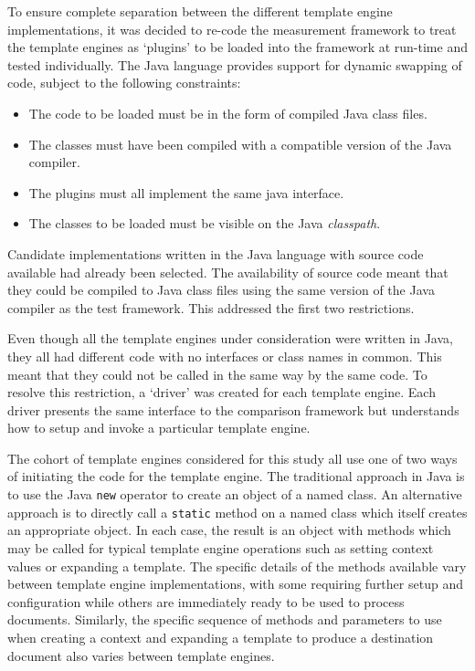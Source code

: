 To ensure complete separation between the different template engine implementations, it was decided to re-code the measurement framework to treat the template engines as `plugins' to be loaded into the framework at run-time and tested individually. The Java language provides support for dynamic swapping of code, subject to the following constraints:

\begin{itemize}
    \item The code to be loaded must be in the form of compiled Java class files.
    \item The classes must have been compiled with a compatible version of the Java compiler.
    \item The plugins must all implement the same java interface.
    \item The classes to be loaded must be visible on the Java \emph{classpath}.
\end{itemize}

Candidate implementations written in the Java language with source code available had already been selected. The availability of source code meant that they could be compiled to Java class files using the same version of the Java compiler as the test framework. This addressed the first two restrictions.

Even though all the template engines under consideration were written in Java, they all had different code with no interfaces or class names in common. This meant that they could not be called in the same way by the same code. To resolve this restriction, a `driver' was created for each template engine. Each driver presents the same interface to the comparison framework but understands how to setup and invoke a particular template engine.

The cohort of template engines considered for this study all use one of two ways of initiating the code for the template engine. The traditional approach in Java is to use the Java \verb!new! operator to create an object of a named class. An alternative approach is to directly call a \verb!static! method on a named class which itself creates an appropriate object. In each case, the result is an object with methods which may be called for typical template engine operations such as setting context values or expanding a template. The specific details of the methods available vary between template engine implementations, with some requiring further setup and configuration while others are immediately ready to be used to process documents. Similarly, the specific sequence of methods and parameters to use when creating a context and expanding a template to produce a destination document also varies between template engines.

